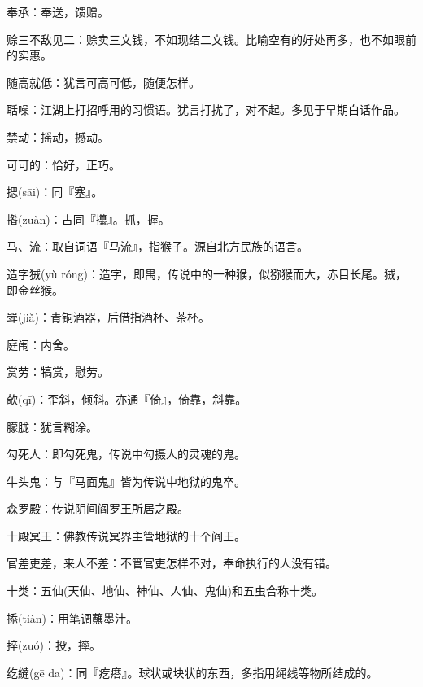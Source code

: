 \startbuffer[152]
奉承：奉送，馈赠。
\stopbuffer


\startbuffer[153]
赊三不敌见二：赊卖三文钱，不如现结二文钱。比喻空有的好处再多，也不如眼前的实惠。
\stopbuffer


\startbuffer[154]
随高就低：犹言可高可低，随便怎样。
\stopbuffer


\startbuffer[155]
聒噪：江湖上打招呼用的习惯语。犹言打扰了，对不起。多见于早期白话作品。
\stopbuffer


\startbuffer[156]
禁动：摇动，撼动。
\stopbuffer


\startbuffer[157]
可可的：恰好，正巧。
\stopbuffer


\startbuffer[158]
揌(sāi)：同『塞』。
\stopbuffer


\startbuffer[159]
揝(zuàn)：古同『攥』。抓，握。
\stopbuffer


\startbuffer[160]
马、流：取自词语『马流』，指猴子。源自北方民族的语言。
\stopbuffer


\startbuffer[161]
造字狨(yù róng)：造字，即禺，传说中的一种猴，似猕猴而大，赤目长尾。狨，即金丝猴。
\stopbuffer


\startbuffer[162]
斝(jiǎ)：青铜酒器，后借指酒杯、茶杯。
\stopbuffer


\startbuffer[163]
庭闱：内舍。
\stopbuffer


\startbuffer[164]
赏劳：犒赏，慰劳。
\stopbuffer


\startbuffer[165]
欹(qī)：歪斜，倾斜。亦通『倚』，倚靠，斜靠。
\stopbuffer


\startbuffer[166]
朦胧：犹言糊涂。
\stopbuffer


\startbuffer[167]
勾死人：即勾死鬼，传说中勾摄人的灵魂的鬼。
\stopbuffer


\startbuffer[168]
牛头鬼：与『马面鬼』皆为传说中地狱的鬼卒。
\stopbuffer


\startbuffer[169]
森罗殿：传说阴间阎罗王所居之殿。
\stopbuffer


\startbuffer[170]
十殿冥王：佛教传说冥界主管地狱的十个阎王。
\stopbuffer


\startbuffer[171]
官差吏差，来人不差：不管官吏怎样不对，奉命执行的人没有错。
\stopbuffer


\startbuffer[172]
十类：五仙(天仙、地仙、神仙、人仙、鬼仙)和五虫合称十类。
\stopbuffer


\startbuffer[173]
掭(tiàn)：用笔调蘸墨汁。
\stopbuffer


\startbuffer[174]
捽(zuó)：投，摔。
\stopbuffer


\startbuffer[175]
纥繨(gē da)：同『疙瘩』。球状或块状的东西，多指用绳线等物所结成的。
\stopbuffer


